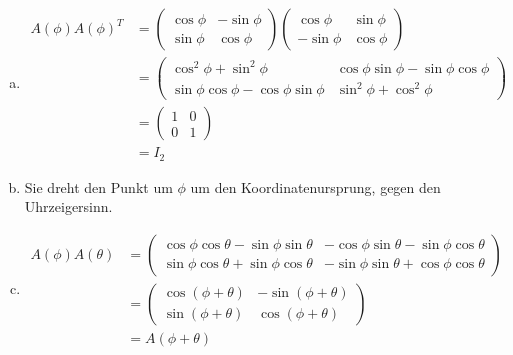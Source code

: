 \documentclass{standalone}
\begin{document}
\begin{enumerate}[a)]
    \item \begin{align}
        A(\phi)A(\phi)^T &= \begin{pmatrix}
            \cos \phi & -\sin \phi \\
            \sin \phi & \cos \phi
        \end{pmatrix}
        \begin{pmatrix}
            \cos \phi & \sin \phi \\
            -\sin \phi & \cos \phi
        \end{pmatrix}
        \\ &= 
        \begin{pmatrix}
            \cos^2 \phi + \sin^2 \phi & \cos \phi \sin \phi - \sin \phi \cos \phi \\
            \sin \phi \cos \phi - \cos \phi \sin \phi & \sin^2 \phi + \cos^2 \phi
        \end{pmatrix}
        \\ &=
        \begin{pmatrix}
            1 & 0 \\
            0 & 1
        \end{pmatrix}
        \\ &= I_2
    \end{align}
    \item Sie dreht den Punkt um $\phi$ um den Koordinatenursprung, gegen den Uhrzeigersinn.
    \item \begin{align}
        A(\phi)A(\theta) &= \begin{pmatrix}
            \cos \phi \cos \theta -\sin \phi \sin \theta & -\cos \phi \sin \theta - \sin \phi \cos \theta \\
            \sin \phi \cos \theta +\sin \phi \cos \theta & -\sin \phi \sin \theta + \cos \phi \cos \theta
        \end{pmatrix}
        \\ &= \begin{pmatrix}
            \cos (\phi + \theta) & -\sin (\phi + \theta) \\
            \sin (\phi + \theta) & \cos (\phi + \theta)
        \end{pmatrix}
        \\ &= A(\phi + \theta)
    \end{align}
\end{enumerate}
\end{document}
